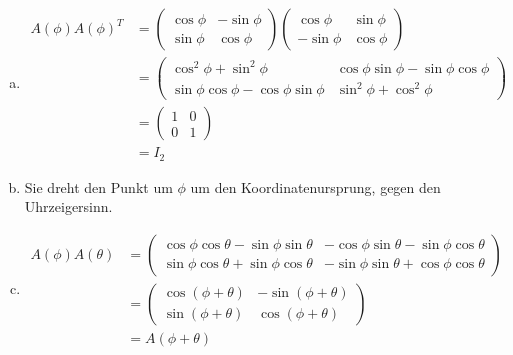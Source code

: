 \documentclass{standalone}
\begin{document}
\begin{enumerate}[a)]
    \item \begin{align}
        A(\phi)A(\phi)^T &= \begin{pmatrix}
            \cos \phi & -\sin \phi \\
            \sin \phi & \cos \phi
        \end{pmatrix}
        \begin{pmatrix}
            \cos \phi & \sin \phi \\
            -\sin \phi & \cos \phi
        \end{pmatrix}
        \\ &= 
        \begin{pmatrix}
            \cos^2 \phi + \sin^2 \phi & \cos \phi \sin \phi - \sin \phi \cos \phi \\
            \sin \phi \cos \phi - \cos \phi \sin \phi & \sin^2 \phi + \cos^2 \phi
        \end{pmatrix}
        \\ &=
        \begin{pmatrix}
            1 & 0 \\
            0 & 1
        \end{pmatrix}
        \\ &= I_2
    \end{align}
    \item Sie dreht den Punkt um $\phi$ um den Koordinatenursprung, gegen den Uhrzeigersinn.
    \item \begin{align}
        A(\phi)A(\theta) &= \begin{pmatrix}
            \cos \phi \cos \theta -\sin \phi \sin \theta & -\cos \phi \sin \theta - \sin \phi \cos \theta \\
            \sin \phi \cos \theta +\sin \phi \cos \theta & -\sin \phi \sin \theta + \cos \phi \cos \theta
        \end{pmatrix}
        \\ &= \begin{pmatrix}
            \cos (\phi + \theta) & -\sin (\phi + \theta) \\
            \sin (\phi + \theta) & \cos (\phi + \theta)
        \end{pmatrix}
        \\ &= A(\phi + \theta)
    \end{align}
\end{enumerate}
\end{document}
